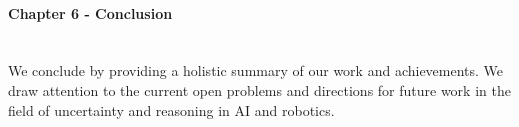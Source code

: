 \begin{minipage}[c]{0.9\textwidth}
\paragraph{Chapter 6 - Conclusion}\\
We conclude by providing a holistic summary of our work and achievements. We draw attention to the current 
open problems and directions for future work in the field of uncertainty and reasoning in AI and robotics.
\end{minipage}







